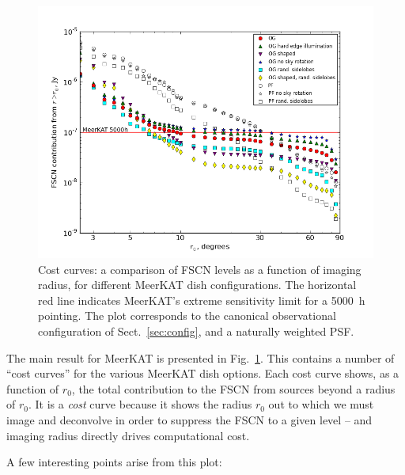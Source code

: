 \documentclass{aa}
\begin{document}
\begin{figure}
  \includegraphics[width=\columnwidth]{costcurve-main}
\caption{\label{fig:cc-main}Cost curves: a comparison of FSCN levels as a function of imaging radius, for different MeerKAT dish configurations. The horizontal red line indicates MeerKAT's extreme sensitivity limit for a 5000~h pointing. The plot corresponds to the canonical observational configuration of Sect.~\ref{sec:config}, and a naturally weighted PSF.}
\end{figure}

The main result for MeerKAT is presented in Fig.~\ref{fig:cc-main}. This contains a number of ``cost curves'' for the various MeerKAT dish options. Each cost curve shows, as a function of $r_0$, the total contribution to the FSCN from sources beyond a radius of $r_0$. It is a \emph{cost} curve because it shows the radius $r_0$ out to which we must image and deconvolve in order to suppress the FSCN to a given level -- and imaging radius directly drives computational cost. 

A few interesting points arise from this plot:
\end{document}
